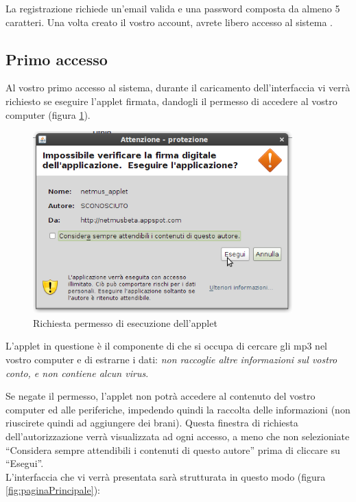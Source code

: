 La registrazione richiede un'email valida e una password composta da almeno 5
caratteri. Una volta creato il vostro account, avrete libero accesso al
sistema .\\

\newpage
\subsection{Primo accesso}

Al vostro primo accesso al sistema, durante il caricamento dell'interfaccia vi
verr\`a richiesto se eseguire l'applet firmata, dandogli il permesso di accedere
al vostro computer (figura \ref{fig:permessiApplet}).
\begin{figure}[!htbp]
  \centering
  \includegraphics[width=10cm]{img/MU/permessi_applet.png}
\caption{Richiesta permesso di esecuzione dell'applet}
\label{fig:permessiApplet}
\end{figure}
L'applet in questione \`e il componente di  che si occupa di cercare
gli mp3 nel vostro computer e di estrarne i dati: \emph{non raccoglie altre
informazioni sul vostro conto, e non contiene alcun virus}.

Se negate il permesso, l'applet non potr\`a accedere al contenuto del vostro
computer ed alle periferiche, impedendo quindi la raccolta delle informazioni
(non riuscirete quindi ad aggiungere dei brani).
Questa finestra di richiesta dell'autorizzazione verr\`a visualizzata ad ogni
accesso, a meno che non selezioniate ``Considera sempre attendibili i contenuti
di questo autore'' prima di cliccare su ``Esegui''.\\

L'interfaccia che vi verr\`a presentata sar\`a strutturata
in questo modo (figura \ref{fig:paginaPrincipale}):\\

